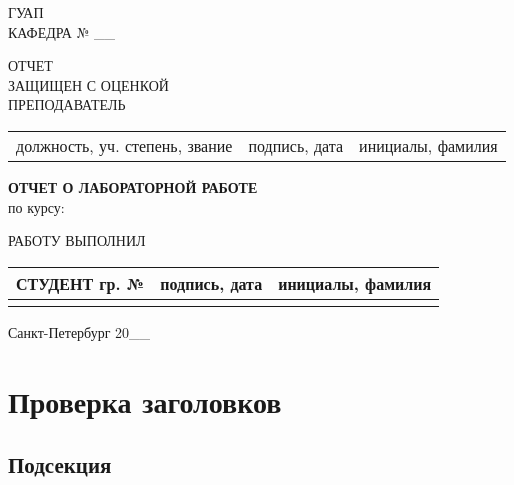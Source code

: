\documentclass{article}
\begin{document}
 \begin{center} ГУАП\\ \vspace{1cm} КАФЕДРА №
\_\_ \\ \vspace{3cm} 
 \end{center}
ОТЧЕТ\\  ЗАЩИЩЕН С ОЦЕНКОЙ
\vspace{0.2cm}\\
ПРЕПОДАВАТЕЛЬ \vspace{0.2cm}\\ 
\begin{tabularx}{\textwidth}{|>{\centering\arraybackslash}p{10cm}|>{\centering\arraybackslash}p{3cm}|>{\centering\arraybackslash}p{4cm}|}  
& & \\ \hline 
    \small{должность, уч. степень, звание} &
\small{подпись, дата} & \small{инициалы, фамилия}   \end{tabularx}

\vspace{3cm} \textbf{ОТЧЕТ О ЛАБОРАТОРНОЙ РАБОТЕ} \\ \vspace{1cm} по курсу:
\underline{\hspace{6cm}} \\ \vspace{1cm}

\vfill \begin{flushright} РАБОТУ ВЫПОЛНИЛ \\ \vspace{0.5cm}
\begin{tabularx}{\textwidth}{|X|X|X|} \hline СТУДЕНТ гр. № & подпись, дата &
инициалы, фамилия \\ \hline & & \\ \hline \end{tabularx} \end{flushright}

\vspace{2cm} 
\begin{center} Санкт-Петербург 20\_\_ \end{center} 
\tableofcontents

\lipsum[1]

\section{Проверка заголовков}
\subsection{Подсекция}
\lipsum[1]
\end{document}
